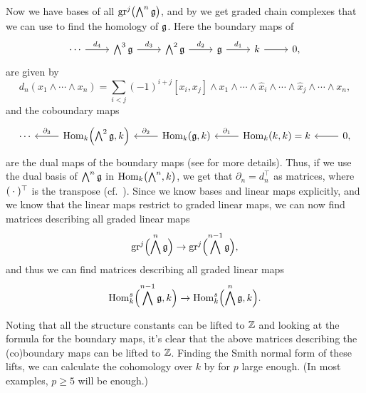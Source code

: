 Now we have bases of all $\operatorname{gr}^{j}\bigl( \bigwedge^{n}\mathfrak{g} \bigr)$, and by \cite[§3.7]{Fuks} we get graded chain complexes that we can use to find the homology of $\mathfrak{g}$. Here the boundary maps of
\[
  \begin{tikzcd}
    \cdots \ar[r,"d_{4}"] & \bigwedge^{3}\lie{g} \ar[r,"d_{3}"] & \bigwedge^{2}\lie{g} \ar[r,"d_{2}"] & \lie{g} \ar[r,"d_{1}"] & k \ar[r] &  0,
  \end{tikzcd}
\]
are given by
\begin{equation*}
  d_{n}(x_{1} \wedge \dotsb \wedge x_{n}) = \sum_{i<j} (-1)^{i+j}[x_{i},x_{j}]\wedge x_{1} \wedge \dotsb \wedge \widehat{x}_{i} \wedge \dotsb \wedge \widehat{x}_{j} \wedge \dotsb \wedge x_{n},
\end{equation*}
and the coboundary maps
\[
  \begin{tikzcd}
    \cdots & \ar[l,"\partial_{3}"'] \Hom_{k}\Bigl( \bigwedge^{2}\lie{g}, k \Bigr) & \ar[l,"\partial_{2}"'] \Hom_{k}(\lie{g},k) & \ar[l,"\partial_{1}"'] \Hom_{k}(k, k) = k &  \ar[l] 0,
  \end{tikzcd}
\]
are the dual maps of the boundary maps (see \cite[§3.1]{Fuks} for more details). Thus, if we use the dual basis of $\bigwedge^{n}\mathfrak{g}$ in $\operatorname{Hom}_{k}\bigl( \bigwedge^{n},k \bigr)$, we get that $\partial_{n} = d_{n}^{\top}$ as matrices, where $(\:\cdot\:)^{\top}$ is the transpose (cf.\ ). Since we know bases and linear maps explicitly, and we know that the linear maps restrict to graded linear maps, we can now find matrices describing all graded linear maps
\begin{equation*}
  \operatorname{gr}^{j} \Bigl( \bigwedge^{n}\mathfrak{g} \Bigr) \to \operatorname{gr}^{j} \Bigl( \bigwedge^{n-1}\mathfrak{g} \Bigr),
\end{equation*}
and thus we can find matrices describing all graded linear maps
\begin{equation*}
  \operatorname{Hom}_{k}^{s}\Bigl( \bigwedge^{n-1}\mathfrak{g},k \Bigr) \to \operatorname{Hom}_{k}^{s}\Bigl( \bigwedge^{n}\mathfrak{g}, k \Bigr).
\end{equation*}

Noting that all the structure constants can be lifted to $\mathbb{Z}$ and looking at the formula for the boundary maps, it's clear that the above matrices describing the (co)boundary maps can be lifted to $\mathbb{Z}$. Finding the Smith normal form of these lifts, we can calculate the cohomology over $k$ by  for $p$ large enough. (In most examples, $p\geq5$ will be enough.)

